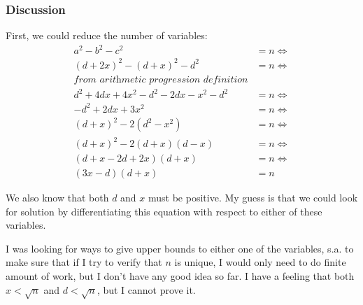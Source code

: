 \documentclass[11pt]{article}
\begin{document}
\subsubsection{Discussion}
\label{sec:orgheadline19}
First, we could reduce the number of variables:
\begin{align*}
  a^2 - b^2 - c^2                         &= n \iff \\
  (d + 2x)^2 - (d + x)^2 - d^2            &= n \iff \\
  \textit{from arithmetic progression definition} & \\
  d^2 + 4dx + 4x^2 - d^2 - 2dx - x^2 - d^2 &= n \iff \\
  -d^2 + 2dx + 3x^2                        &= n \iff \\
  (d + x)^2 - 2(d^2 - x^2)                 &= n \iff \\
  (d + x)^2 - 2(d + x)(d - x)              &= n \iff \\
  (d + x -2d + 2x)(d + x)                  &= n \iff \\
  (3x - d)(d + x)                          &= n
\end{align*}

We also know that both \(d\) and \(x\) must be positive.  My guess is that we
could look for solution by differentiating this equation with respect to
either of these variables.

I was looking for ways to give upper bounds to either one of the variables,
s.a. to make sure that if I try to verify that \(n\) is unique, I would only
need to do finite amount of work, but I don't have any good idea so far.  I
have a feeling that both \(x < \sqrt{n}\) and \(d < \sqrt{n}\), but I cannot
prove it.
\end{document}
